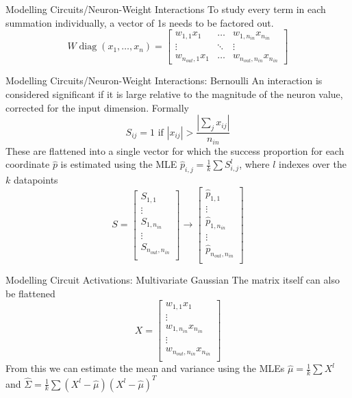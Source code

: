 \documentclass{beamer}
\DeclareMathOperator{\diag}{diag}
\begin{document}
    \begin{frame}{Modelling Circuits/Neuron-Weight Interactions}
        To study every term in each summation individually, a vector of 1s needs to be factored out.
        \[
            W\diag(x_1, \dots, x_n)    
            = 
            \begin{bmatrix}
                w_{1, 1}x_1 & \dots & w_{1, n_{in}}x_{n_{in}} \\
                \vdots & \ddots & \vdots \\
                w_{n_{out}, 1}x_1 & \dots & w_{n_{out}, n_{in}}x_{n_{in}}
            \end{bmatrix}
        \]
    \end{frame}
    
    \begin{frame}{Modelling Circuits/Neuron-Weight Interactions: Bernoulli}
        An interaction is considered significant if it is large relative to the magnitude of the neuron value, corrected for the input dimension. Formally 
        \[S_{ij} = 1 \text{ if } |x_{ij}| > \frac{|\sum_j x_{ij}|}{n_{in}} \]
        These are flattened into a single vector for which the success proportion for each coordinate $\hat{p}$ is estimated using the MLE $\hat{p}_{i, j} = \frac{1}{k}\sum {S_{i, j}^l}$, where $l$ indexes over the $k$ datapoints
        \[S = 
        \begin{bmatrix}
            S_{1,1} \\
            \vdots \\
            S_{1,n_{in}} \\
            \vdots \\
            S_{n_{out},n_{in}} \\
        \end{bmatrix} \rightarrow 
        \begin{bmatrix}
            \hat{p}_{1,1} \\
            \vdots \\
            \hat{p}_{1,n_{in}} \\
            \vdots \\
            \hat{p}_{n_{out},n_{in}} \\
        \end{bmatrix} 
        \]
    \end{frame}

    \begin{frame}{Modelling Circuit Activations: Multivariate Gaussian}
        The matrix itself can also be flattened 
        \[X = 
        \begin{bmatrix}
            w_{1,1}x_1 \\
            \vdots \\
            w_{1,n_{in}}x_{n_{in}} \\
            \vdots \\
            w_{n_{out},n_{in}}x_{n_{in}} \\
        \end{bmatrix}
        \]
        From this we can estimate the mean and variance using the MLEs $\hat{\mu} = \frac{1}{k} \sum X^l$ and $\hat{\Sigma} = \frac{1}{k} \sum (X^l - \hat{\mu})(X^l - \hat{\mu})^T$
    \end{frame}
\end{document}
